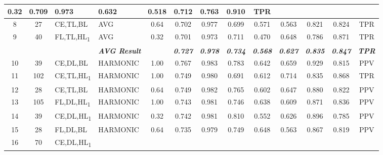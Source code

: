 \begin{table}[H]
{\begin{tabular}{ccl|l|c|c|c|c|c|c|c|c|c|}
    0.32 &
    0.709 &
    0.973 &
    0.632 &
    0.518 &
    0.712 &
    0.763 &
    0.910 &
    TPR \\ \hline
  \multicolumn{1}{|c|}{8} &
    \multicolumn{1}{c|}{27} &
    CE,TL,BL &
    AVG &
    0.64 &
    0.702 &
    0.977 &
    0.699 &
    0.571 &
    0.563 &
    0.821 &
    0.824 &
    TPR \\ \hline
  \multicolumn{1}{|c|}{9} &
    \multicolumn{1}{c|}{40} &
    FL,TL,HL\textsubscript{1} &
    AVG &
    0.32 &
    0.701 &
    0.973 &
    0.711 &
    0.470 &
    0.648 &
    0.786 &
    0.871 &
    TPR \\ \hline
   &
    \textit{\textbf{}} &
     &
    \textit{\textbf{AVG Result}} &
     &
    \textit{\textbf{0.727}} &
    \textit{\textbf{0.978}} &
    \textit{\textbf{0.734}} &
    \textit{\textbf{0.568}} &
    \textit{\textbf{0.627}} &
    \textit{\textbf{0.835}} &
    \textit{\textbf{0.847}} &
    \textit{\textbf{TPR}} \\ \hline
  \multicolumn{1}{|c|}{10} &
    \multicolumn{1}{c|}{39} &
    CE,DL,BL &
    HARMONIC &
    1.00 &
    0.767 &
    0.983 &
    0.783 &
    0.642 &
    0.659 &
    0.929 &
    0.815 &
    PPV \\ \hline
  \multicolumn{1}{|c|}{11} &
    \multicolumn{1}{c|}{102} &
    CE,TL,HL\textsubscript{1} &
    HARMONIC &
    1.00 &
    0.749 &
    0.980 &
    0.691 &
    0.612 &
    0.714 &
    0.835 &
    0.868 &
    TPR \\ \hline
  \multicolumn{1}{|c|}{12} &
    \multicolumn{1}{c|}{28} &
    CE,TL,BL &
    HARMONIC &
    0.64 &
    0.749 &
    0.982 &
    0.765 &
    0.602 &
    0.647 &
    0.880 &
    0.822 &
    PPV \\ \hline
  \multicolumn{1}{|c|}{13} &
    \multicolumn{1}{c|}{105} &
    FL,DL,HL\textsubscript{1} &
    HARMONIC &
    1.00 &
    0.743 &
    0.981 &
    0.746 &
    0.638 &
    0.609 &
    0.871 &
    0.836 &
    PPV \\ \hline
  \multicolumn{1}{|c|}{14} &
    \multicolumn{1}{c|}{39} &
    CE,DL,HL\textsubscript{1} &
    HARMONIC &
    0.32 &
    0.742 &
    0.981 &
    0.810 &
    0.552 &
    0.626 &
    0.896 &
    0.785 &
    PPV \\ \hline
  \multicolumn{1}{|c|}{15} &
    \multicolumn{1}{c|}{28} &
    FL,DL,BL &
    HARMONIC &
    0.64 &
    0.735 &
    0.979 &
    0.749 &
    0.648 &
    0.563 &
    0.867 &
    0.819 &
    PPV \\ \hline
  \multicolumn{1}{|c|}{16} &
    \multicolumn{1}{c|}{70} &
    CE,DL,HL\textsubscript{1} &

\end{tabular}}
\end{table}
